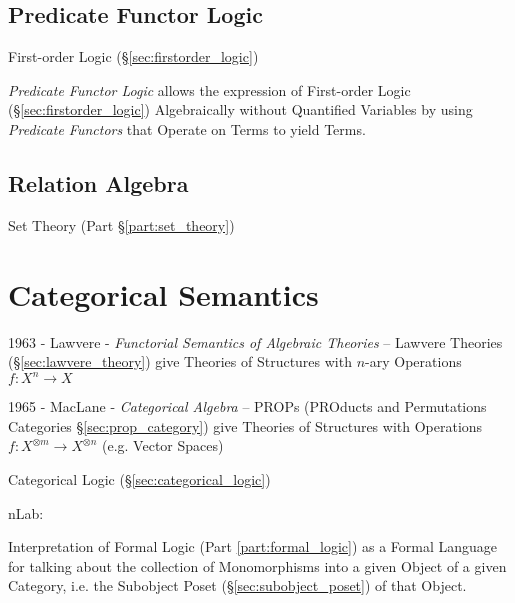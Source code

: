 \subsection{Predicate Functor Logic}\label{sec:pfl}

First-order Logic (\S\ref{sec:firstorder_logic})

\emph{Predicate Functor Logic} allows the expression of First-order
Logic (\S\ref{sec:firstorder_logic}) Algebraically without Quantified
Variables by using \emph{Predicate Functors} that Operate on Terms to
yield Terms.



\subsection{Relation Algebra}\label{sec:relation_algebra}

Set Theory (Part \S\ref{part:set_theory})



\section{Categorical Semantics}\label{sec:categorical_semantics}

1963 - Lawvere - \emph{Functorial Semantics of Algebraic Theories} -- Lawvere
Theories (\S\ref{sec:lawvere_theory}) give Theories of Structures with $n$-ary
Operations $f : X^n \rightarrow X$

1965 - MacLane - \emph{Categorical Algebra} -- PROPs (PROducts and Permutations
Categories \S\ref{sec:prop_category}) give Theories of Structures with
Operations $f : X^{\otimes m} \rightarrow X^{\otimes n}$ (e.g. Vector Spaces)

\fist Categorical Logic (\S\ref{sec:categorical_logic})

nLab:

Interpretation of Formal Logic (Part \ref{part:formal_logic}) as a
Formal Language for talking about the collection of Monomorphisms into
a given Object of a given Category, i.e. the Subobject Poset
(\S\ref{sec:subobject_poset}) of that Object.


